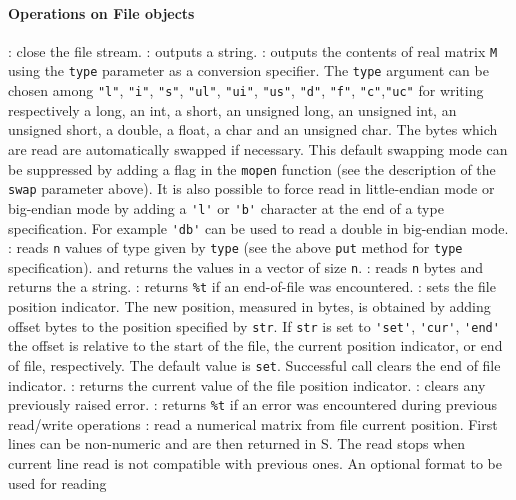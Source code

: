 \paragraph{Operations on File objects}
\begin{itemize}
  : close the file stream.
  : outputs a string. 
  : outputs the contents of real matrix \verb+M+ using 
  the \verb!type! parameter as a conversion specifier. The \verb+type+ argument can be chosen 
  among \verb+"l"+, \verb+"i"+, \verb+"s"+, \verb+"ul"+, \verb+"ui"+, \verb+"us"+, \verb+"d"+, \verb+"f"+, 
  \verb+"c"+,\verb+"uc"+ for writing respectively a long, an int, a short, an unsigned long, 
  an unsigned int, an unsigned short, a double, a float, a char and an unsigned char. 
  The bytes which are read are automatically swapped if necessary. 
  This default swapping mode can be suppressed by adding a flag in the \verb!mopen! function 
  (see the description of the \verb+swap+ parameter above).
  It is also possible to force read in little-endian mode or big-endian mode by adding a \verb+'l'+ or \verb+'b'+  
  character at the end of a type specification. For example \verb+'db'+ can be used to read a double 
  in big-endian mode. 
  : reads \verb+n+ values of type given by \verb+type+ 
  (see the above \verb+put+ method for \verb+type+ specification).
  and returns the values in a vector of size \verb+n+. 
  : reads \verb+n+ bytes and returns the a string.
  : returns \verb+%t+ if an end-of-file was encountered. 
  :  sets  the  file  position indicator. The new position, 
  measured in bytes, is obtained by adding offset bytes to  the
  position  specified by \verb+str+. If \verb+str+ is set to \verb+'set'+, \verb+'cur'+, 
  \verb+'end'+ the offset is relative to the start of the file, 
  the current position indicator, or  end of file,  respectively. The default value 
  is \verb+set+.
  Successful call clears the end of file indicator.
  : returns the current value of the file position indicator. 
  : clears any previously raised error.
  : returns \verb+%t+ if an error was encountered during previous read/write 
  operations 
  : read a numerical matrix from file current position. 
  First lines can be non-numeric and are then returned in S. The read stops when current 
  line read is not compatible with previous ones. An optional format to be used for reading

\end{itemize}
